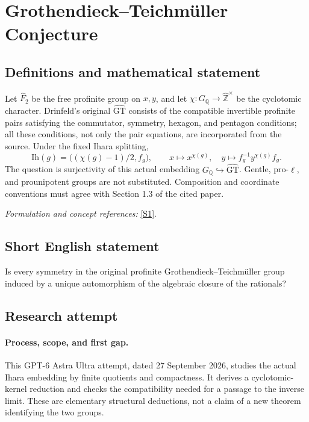 \documentclass[11pt]{article}
\begin{document}
\section*{\texorpdfstring{Grothendieck–Teichmüller Conjecture}{Grothendieck–Teichmüller Conjecture}}\label{30006722}
\subsection{Definitions and mathematical statement}
Let $\widehat F_2$ be the free profinite group on $x,y$, and let $\chi:G_{{\mathbb{Q}}}\to\widehat{{\mathbb{Z}}}^\times$ be the cyclotomic character. Drinfeld's original $\widehat{\mathrm{GT}}$ consists of the compatible invertible profinite pairs satisfying the commutator, symmetry, hexagon, and pentagon conditions; all these conditions, not only the pair equations, are incorporated from the source. Under the fixed Ihara splitting,
\[
 \mathrm{Ih}(g)=\bigl((\chi(g)-1)/2,f_g\bigr),\qquad
 x\mapsto x^{\chi(g)},\quad y\mapsto f_g^{-1}y^{\chi(g)}f_g.
\]
The question is surjectivity of this actual embedding $G_{{\mathbb{Q}}}\hookrightarrow\widehat{\mathrm{GT}}$. Gentle, pro-$\ell$, and prounipotent groups are not substituted. Composition and coordinate conventions must agree with Section 1.3 of the cited paper.
\par\smallskip\textit{Formulation and concept references:} \href{https://arxiv.org/pdf/2405.11725v3}{[S1]}.

\subsection{Short English statement}
Is every symmetry in the original profinite Grothendieck--Teichmüller group induced by a unique automorphism of the algebraic closure of the rationals?
\subsection{Research attempt}
\paragraph{Process, scope, and first gap.}
This GPT-6 Astra Ultra attempt, dated 27 September 2026, studies the actual Ihara embedding by finite quotients and compactness. It derives a cyclotomic-kernel reduction and checks the compatibility needed for a passage to the inverse limit. These are elementary structural deductions, not a claim of a new theorem identifying the two groups.
\end{document}
